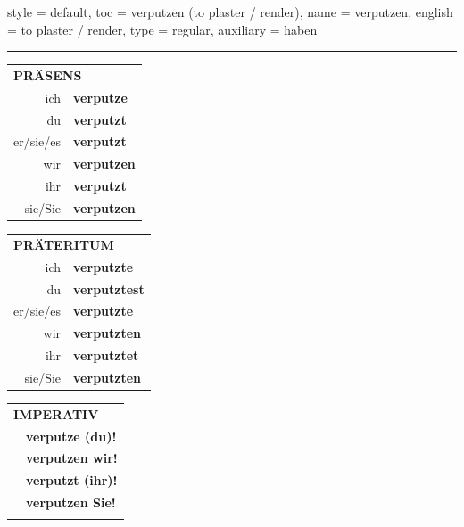 \begin{verbentry}{
  style = {default},
  toc = {verputzen (to plaster / render)},
  name = {verputzen},
  english = {to plaster / render},
  type = {regular},
  auxiliary = {haben}
}
 
    
     \vspace{5pt}

    \hrule
    
    \vspace{5pt}

  \begin{tabular}{rl}
     \multicolumn{2}{l}{\textbf{PRÄSENS} }\\
    ich & \textbf{verputze}\\
    du & \textbf{verputzt}\\
    er/sie/es & \textbf{verputzt}\\
    wir & \textbf{verputzen}\\
    ihr & \textbf{verputzt}\\
    sie/Sie & \textbf{verputzen}\\
  \end{tabular}
  \hfill
  \begin{tabular}{rl}
    \multicolumn{2}{l}{\textbf{PRÄTERITUM} }\\
    ich & \textbf{verputzte}\\
    du & \textbf{verputztest}\\
    er/sie/es & \textbf{verputzte}\\
    wir & \textbf{verputzten}\\
    ihr & \textbf{verputztet}\\
    sie/Sie & \textbf{verputzten}\\
  \end{tabular}
  \hfill
  \begin{tabular}{rl}
     \multicolumn{2}{l}{\textbf{IMPERATIV} }\\
   & \textbf{verputze (du)!}\\
   & \textbf{verputzen wir!}\\
   & \textbf{verputzt (ihr)!}\\
   & \textbf{verputzen Sie!}\\
   & \vspace{10pt}
  \end{tabular}

 \vspace{10pt}


\end{verbentry}
